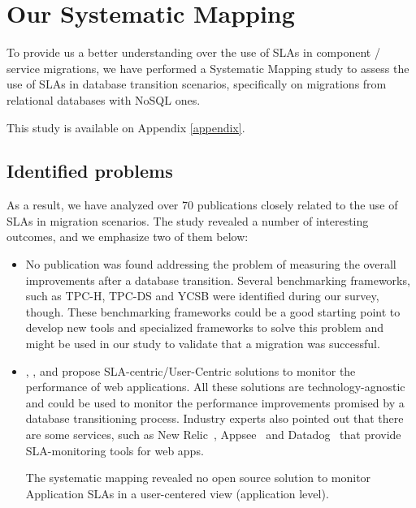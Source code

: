 \section{Our Systematic Mapping}\label{oursystematicmapping}

To provide us a better understanding over the use of SLAs in component / service migrations, we have performed a Systematic Mapping study to assess the use of SLAs in database transition scenarios, specifically on migrations from relational databases with NoSQL ones. 

This study is available on Appendix \ref{appendix}. 

\subsection{Identified problems}

As a result, we have analyzed over 70 publications closely related to the use of SLAs in migration scenarios. The study revealed a number of interesting outcomes, and we emphasize two of them below:

\begin{itemize}
\item{No publication was found addressing the problem of measuring the overall improvements after a database transition. Several benchmarking frameworks, such as TPC-H, TPC-DS and YCSB were identified \cite{6616442} during our survey, though. These benchmarking frameworks could be a good starting point to develop new tools and specialized frameworks to solve this problem and might be used in our study to validate that a migration was successful.
}

\item{ \cite{6253526}, \cite{6461875}, \cite{6511780} and \cite{Xiong:2011:APA:2038916.2038931} propose SLA-centric/User-Centric solutions to monitor the performance of web applications. All these solutions are technology-agnostic and could be used to monitor the performance improvements promised by a database transitioning process. Industry experts also pointed out that there are some services, such as New Relic~\cite{newrelic}, Appsee~\cite{appsee} and Datadog~\cite{datadog} that provide SLA-monitoring tools for web apps. 

The systematic mapping revealed no open source solution to monitor Application SLAs in a user-centered view (application level).  
}

\end{itemize}



